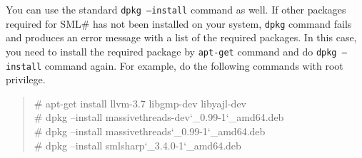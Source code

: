 \documentclass{jbook}
\newcommand{\smlsharp}{SML\#}
\newcommand{\version}{3.4.0}
\newenvironment{program}{\begin{quote}\begin{tt}}%
                        {\end{tt}\end{quote}}
\begin{document}
\begin{enumerate}
	You can use the standard {\tt dpkg --install} command as well.
	If other packages required for \smlsharp{} has not been installed
on your system, {\tt dpkg} command fails and produces an error message with
a list of the required packages.
	In this case, you need to install the required package by {\tt apt-get}
command and do {\tt dpkg --install} command again.
	For example, %
do the following commands with root privilege.
\begin{program}
\# apt-get install llvm-3.7 libgmp-dev libyajl-dev\\
\# dpkg --install massivethreads-dev\char`\_0.99-1\char`\_amd64.deb\\
\# dpkg --install massivethreads\char`\_0.99-1\char`\_amd64.deb\\
\# dpkg --install smlsharp\char`\_\version{}-1\char`\_amd64.deb
\end{program}
\end{enumerate}
\end{document}

